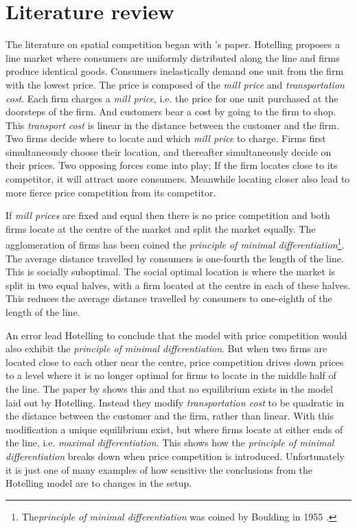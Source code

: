 \documentclass[preprint, 12pt]{elsarticle}
\begin{document}
\section{Literature review}

The literature on spatial competition began with \citeauthor{Hotelling_1929}'s \citeyearpar{Hotelling_1929} paper. Hotelling proposes a line market where consumers are uniformly distributed along the line and firms produce identical goods. Consumers inelastically demand one unit from the firm with the lowest price. The price is composed of the \emph{mill price} and \emph{transportation cost}. Each firm charges a \emph{mill price}, i.e. the price for one unit purchased at the doorsteps of the firm. And customers bear a cost by going to the firm to shop. This \emph{transport cost} is linear in the distance between the customer and the firm. Two firms decide where to locate and which \emph{mill price} to charge. Firms first simultaneously choose their location, and thereafter simultaneously decide on their prices. Two opposing forces come into play; If the firm locates close to its competitor, it will attract more consumers. Meanwhile locating closer also lead to more fierce price competition from its competitor.

If \emph{mill prices} are fixed and equal then there is no price competition and both firms locate at the centre of the market and split the market equally. The agglomeration of firms has been coined the \emph{principle of minimal differentiation}\footnote{The\emph{principle of minimal differentiation} was coined by Boulding in 1955 \citep{Biscaia_Mota_2013}.}. The average distance travelled by consumers is one-fourth the length of the line. This is socially suboptimal. The social optimal location is where the market is split in two equal halves, with a firm located at the centre in each of these halves. This reduces the average distance travelled by consumers to one-eighth of the length of the line. 

An error lead Hotelling to conclude that the model with price competition would also exhibit the \emph{principle of minimal differentiation}. But when two firms are located close to each other near the centre, price competition drives down prices to a level where it is no longer optimal for firms to locate in the middle half of the line. The paper by \citet{dAspremont_Gabszewicz_Thisse_1979} shows this and that no equilibrium exists in the model laid out by Hotelling. Instead they modify \emph{transportation cost} to be quadratic in the distance between the customer and the firm, rather than linear. With this modification a unique equilibrium exist, but where firms locate at either ends of the line, i.e. \emph{maximal differentiation}. This shows how the \emph{principle of minimal differentiation} breaks down when price competition is introduced. Unfortunately it is just one of many examples of how sensitive the conclusions from the Hotelling model are to changes in the setup. 
\end{document}
